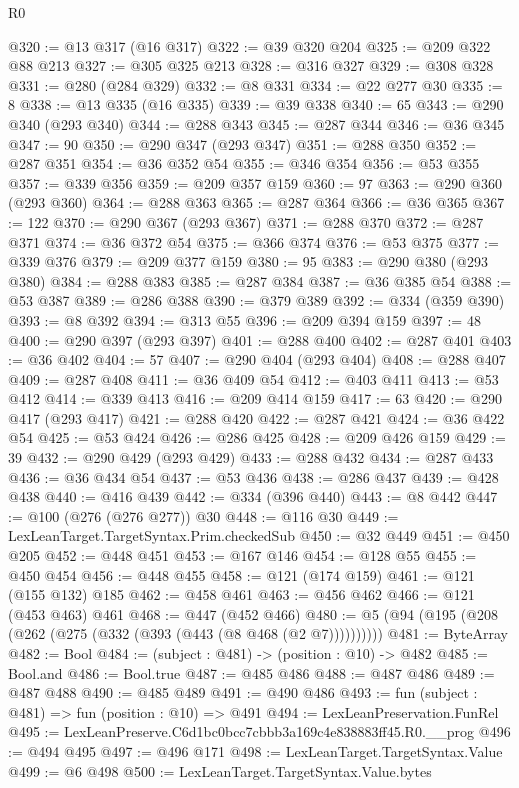 \begin{lexlean}{R0}
\begin{coremodule}
@320 := @13 @317 (@16 @317)
@322 := @39 @320 @204
@325 := @209 @322 @88 @213
@327 := @305 @325 @213
@328 := @316 @327
@329 := @308 @328
@331 := @280 (@284 @329)
@332 := @8 @331
@334 := @22 @277 @30
@335 := 8
@338 := @13 @335 (@16 @335)
@339 := @39 @338
@340 := 65
@343 := @290 @340 (@293 @340)
@344 := @288 @343
@345 := @287 @344
@346 := @36 @345
@347 := 90
@350 := @290 @347 (@293 @347)
@351 := @288 @350
@352 := @287 @351
@354 := @36 @352 @54
@355 := @346 @354
@356 := @53 @355
@357 := @339 @356
@359 := @209 @357 @159
@360 := 97
@363 := @290 @360 (@293 @360)
@364 := @288 @363
@365 := @287 @364
@366 := @36 @365
@367 := 122
@370 := @290 @367 (@293 @367)
@371 := @288 @370
@372 := @287 @371
@374 := @36 @372 @54
@375 := @366 @374
@376 := @53 @375
@377 := @339 @376
@379 := @209 @377 @159
@380 := 95
@383 := @290 @380 (@293 @380)
@384 := @288 @383
@385 := @287 @384
@387 := @36 @385 @54
@388 := @53 @387
@389 := @286 @388
@390 := @379 @389
@392 := @334 (@359 @390)
@393 := @8 @392
@394 := @313 @55
@396 := @209 @394 @159
@397 := 48
@400 := @290 @397 (@293 @397)
@401 := @288 @400
@402 := @287 @401
@403 := @36 @402
@404 := 57
@407 := @290 @404 (@293 @404)
@408 := @288 @407
@409 := @287 @408
@411 := @36 @409 @54
@412 := @403 @411
@413 := @53 @412
@414 := @339 @413
@416 := @209 @414 @159
@417 := 63
@420 := @290 @417 (@293 @417)
@421 := @288 @420
@422 := @287 @421
@424 := @36 @422 @54
@425 := @53 @424
@426 := @286 @425
@428 := @209 @426 @159
@429 := 39
@432 := @290 @429 (@293 @429)
@433 := @288 @432
@434 := @287 @433
@436 := @36 @434 @54
@437 := @53 @436
@438 := @286 @437
@439 := @428 @438
@440 := @416 @439
@442 := @334 (@396 @440)
@443 := @8 @442
@447 := @100 (@276 (@276 @277)) @30
@448 := @116 @30
@449 := LexLeanTarget.TargetSyntax.Prim.checkedSub
@450 := @32 @449
@451 := @450 @205
@452 := @448 @451
@453 := @167 @146
@454 := @128 @55
@455 := @450 @454
@456 := @448 @455
@458 := @121 (@174 @159)
@461 := @121 (@155 @132) @185
@462 := @458 @461
@463 := @456 @462
@466 := @121 (@453 @463) @461
@468 := @447 (@452 @466)
@480 := @5 (@94 (@195 (@208 (@262 (@275 (@332 (@393 (@443 (@8 @468 (@2 @7))))))))))
@481 := ByteArray
@482 := Bool
@484 := (subject : @481) -> (position : @10) -> @482
@485 := Bool.and
@486 := Bool.true
@487 := @485 @486
@488 := @487 @486
@489 := @487 @488
@490 := @485 @489
@491 := @490 @486
@493 := fun (subject : @481) => fun (position : @10) => @491
@494 := LexLeanPreservation.FunRel
@495 := LexLeanPreserve.C6d1bc0bcc7cbbb3a169c4e838883ff45.R0.__prog
@496 := @494 @495
@497 := @496 @171
@498 := LexLeanTarget.TargetSyntax.Value
@499 := @6 @498
@500 := LexLeanTarget.TargetSyntax.Value.bytes

\end{coremodule}
\end{lexlean}
